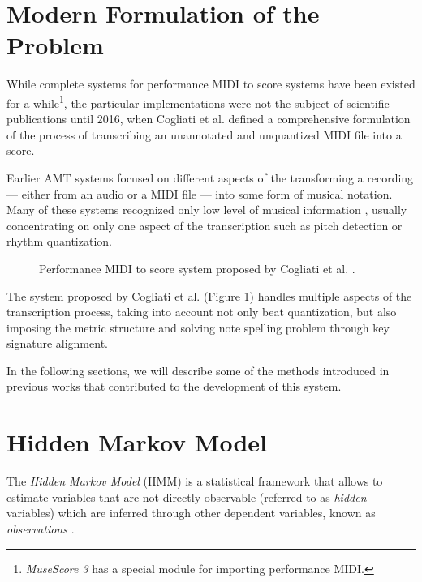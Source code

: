 \section{Modern Formulation of the Problem}

While complete systems for performance MIDI to score systems have been existed for a while\footnote{\emph{MuseScore 3} has a special module for importing performance MIDI. \missing}, the particular implementations were not the subject of scientific publications until 2016, when Cogliati et al. defined a comprehensive formulation of the process of transcribing an unannotated and unquantized MIDI file into a score. 

Earlier AMT systems focused on different aspects of the transforming a recording --- either from an audio or a MIDI file --- into some form of musical notation. Many of these systems recognized only low level of musical information \cite{Cogliati2016}, usually concentrating on only one aspect of the transcription such as pitch detection or rhythm quantization.

\begin{figure}[!ht]
\centering

\caption[Performance MIDI to score system proposed by Cogliati et al.]{Performance MIDI to score system proposed by Cogliati et al. \cite{Cogliati2016}.}
\label{transcription_system}
\end{figure}

The system proposed by Cogliati et al. (Figure \ref{transcription_system}) handles multiple aspects of the transcription process, taking into account not only beat quantization, but also imposing the metric structure and solving note spelling problem through key signature alignment.

In the following sections, we will describe some of the methods introduced in previous works that contributed to the development of this system.

\section{Hidden Markov Model}

The \emph{Hidden Markov Model} (HMM) is a statistical framework that allows to estimate variables that are not directly observable (referred to as \emph{hidden} variables) which are inferred through other dependent variables, known as \emph{observations} \cite[p. 210--213]{Jurafsky2009}.

